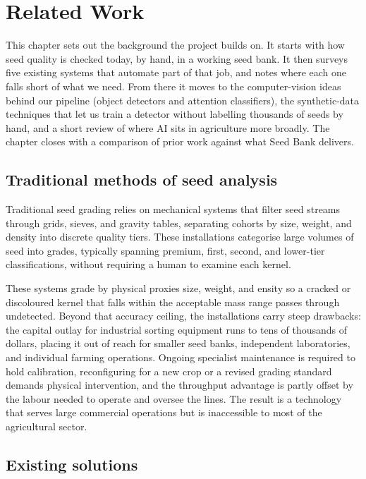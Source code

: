 \chapter{Related Work}

This chapter sets out the background the project builds on. It starts with how
seed quality is checked today, by hand, in a working seed bank. It then surveys
five existing systems that automate part of that job, and notes where each one
falls short of what we need. From there it moves to the computer-vision ideas
behind our pipeline (object detectors and attention classifiers), the
synthetic-data techniques that let us train a detector without labelling
thousands of seeds by hand, and a short review of where AI sits in agriculture
more broadly. The chapter closes with a comparison of prior work against what
Seed Bank delivers.

\section{Traditional methods of seed analysis}

Traditional seed grading relies on mechanical systems that filter seed streams
through grids, sieves, and gravity tables, separating cohorts by size, weight,
and density into discrete quality tiers. These installations categorise large
volumes of seed into grades, typically spanning premium, first, second, and
lower-tier classifications, without requiring a human to examine each kernel.

These systems grade by physical proxies size, weight, and ensity so a
cracked or discoloured kernel that falls within the acceptable mass range passes
through undetected. Beyond that accuracy ceiling, the installations carry steep
drawbacks: the capital outlay for industrial sorting equipment runs to tens of
thousands of dollars, placing it out of reach for smaller seed banks, independent
laboratories, and individual farming operations. Ongoing specialist maintenance
is required to hold calibration, reconfiguring for a new crop or a revised
grading standard demands physical intervention, and the throughput advantage is
partly offset by the labour needed to operate and oversee the lines. The result
is a technology that serves large commercial operations but is inaccessible to
most of the agricultural sector.

\section{Existing solutions}

